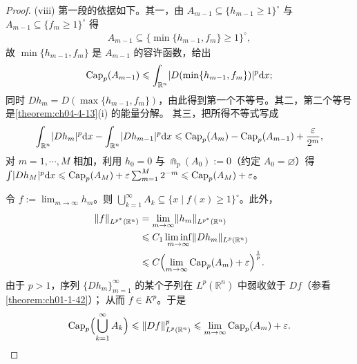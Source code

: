 \documentclass[../../main.tex]{subfiles}%
\begin{document}
\begin{proof}
(viii) 第一段的依据如下。其一，由 $A_{m-1}\subseteq\{h_{m-1}\geqslant1\}^{\circ}$ 与 $A_{m-1}\subseteq\{f_m\geqslant1\}^{\circ}$ 得
\begin{align*}
A_{m-1}\subseteq\{\min\{h_{m-1},f_m\}\geqslant1\}^{\circ},
\end{align*}
故 $\min\{h_{m-1},f_m\}$ 是 $A_{m-1}$ 的容许函数，给出
\begin{align*}
\Cap_p(A_{m-1})\leqslant\int_{\mathbb{R}^n}\lvert D(\min\{h_{m-1},f_m\})\rvert^p\diff x;
\end{align*}
同时 $Dh_m=D(\max\{h_{m-1},f_m\})$，由此得到第一个不等号。其二，第二个等号是\cref{theorem:ch04-4-13}(i) 的能量分解。%
其三，把所得不等式写成
\begin{align*}
\int_{\mathbb{R}^n}\lvert Dh_m\rvert^p\diff x-\int_{\mathbb{R}^n}\lvert Dh_{m-1}\rvert^p\diff x\leqslant\Cap_p(A_m)-\Cap_p(A_{m-1})+\frac{\varepsilon}{2^m},
\end{align*}
对 $m=1,\cdots,M$ 相加，利用 $h_0=0$ 与 $\Cap_p(A_0):=0$（约定 $A_0=\varnothing$）得 $\int\lvert Dh_M\rvert^p\diff x\leqslant\Cap_p(A_M)+\varepsilon\sum_{m=1}^{M}2^{-m}\leqslant\Cap_p(A_M)+\varepsilon$。

令 $f:=\lim_{m\to\infty}h_m$。则 $\bigcup_{k=1}^{\infty}A_k\subseteq\{x\mid f(x)\geqslant1\}^{\circ}$。此外，
\begin{align*}
\lVert f\rVert_{L^{p^*}(\mathbb{R}^n)}&=\lim_{m\to\infty}\lVert h_m\rVert_{L^{p^*}(\mathbb{R}^n)}\\
&\leqslant C_1\liminf_{m\to\infty}\lVert Dh_m\rVert_{L^p(\mathbb{R}^n)}\\
&\leqslant C\Bigl(\lim_{m\to\infty}\Cap_p(A_m)+\varepsilon\Bigr)^{\frac{1}{p}} .
\end{align*}
由于 $p>1$，序列 $\{Dh_m\}_{m=1}^{\infty}$ 的某个子列在 $L^p(\mathbb{R}^n)$ 中弱收敛于 $Df$（参看\cref{theorem:ch01-1-42}）；%
从而 $f\in K^p$。于是
\begin{align*}
\Cap_p\Bigl(\bigcup_{k=1}^{\infty}A_k\Bigr)\leqslant\lVert Df\rVert_{L^p(\mathbb{R}^n)}^p\leqslant\lim_{m\to\infty}\Cap_p(A_m)+\varepsilon .
\end{align*}


\end{proof}
\end{document}
